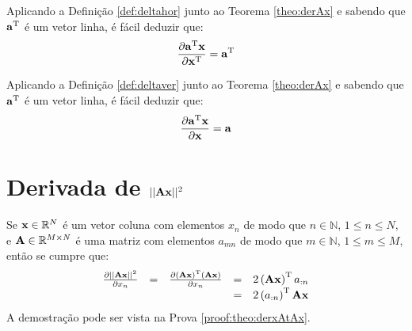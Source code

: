 \begin{corollaryT}\label{coro:derAx3}
Aplicando a Definição \ref{def:deltahor} junto ao Teorema \ref{theo:derAx} e sabendo que $\VECTOR{a}^{\transpose}$
é um vetor linha, é
fácil deduzir que:
\begin{equation}
\frac{\partial \VECTOR{a}^{\transpose}\VECTOR{x}}{\partial \VECTOR{x}^{\transpose}}=\VECTOR{a}^{\transpose}
\end{equation}
\end{corollaryT}

\begin{corollaryT}\label{coro:derAx4}
Aplicando a Definição \ref{def:deltaver} junto ao Teorema \ref{theo:derAx} e sabendo que $\VECTOR{a}^{\transpose}$
é um vetor linha, é
fácil deduzir que:
\begin{equation}
\frac{\partial \VECTOR{a}^{\transpose}\VECTOR{x}}{\partial \VECTOR{x}}=\VECTOR{a}
\end{equation}
\end{corollaryT}

\section{Derivada de $||\MATRIX{A}\VECTOR{x}||^2$ 
}

\begin{theorem}\label{theo:derxAtAx}
Se 
$\VECTOR{x}\in \mathbb{R}^N$ é um vetor coluna com elementos $x_n$ de modo que
$n\in \mathbb{N}$, $1 \leq n \leq N$, e 
$\MATRIX{A} \in \mathbb{R}^{M\times N}$ é uma matriz com elementos $a_{mn}$ de modo que
$m\in \mathbb{N}$, $1 \leq m \leq M$, então se cumpre que:
\begin{equation}
\begin{matrix}
\frac{\partial ||\MATRIX{A}\VECTOR{x}||^2 }{\partial x_n}&=&
\frac{\partial \left(\MATRIX{A}\VECTOR{x}\right)^{\transpose}\left(\MATRIX{A}\VECTOR{x}\right)}{\partial x_n}&=&
2\left(\MATRIX{A}\VECTOR{x}\right)^{\transpose}a_{:n}\\
~&~&~&=& 2\left(a_{:n}\right)^{\transpose}\MATRIX{A}\VECTOR{x}
\end{matrix}
\end{equation}
A demostração pode ser vista na Prova \ref{proof:theo:derxAtAx}.
\end{theorem}


